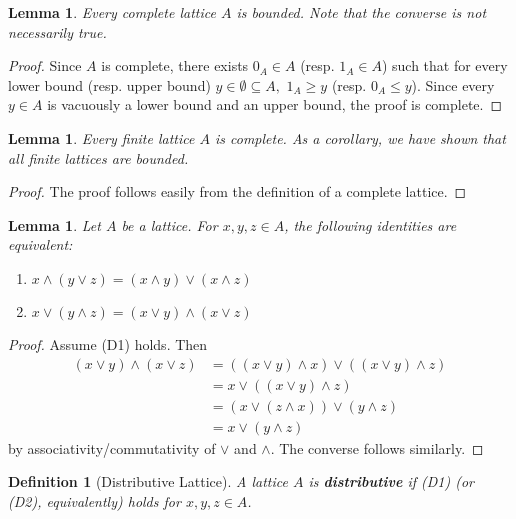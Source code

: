 \documentclass{article}
\newtheorem{lemma}[proposition]{Lemma}
\newtheorem{definition}[proposition]{Definition}
\numberwithin{equation}{section}
\newcommand{\meet}{\wedge}
\newcommand{\join}{\vee}
\begin{document}
\begin{lemma}
Every complete lattice $A$ is bounded. Note that the converse is not necessarily true.
\end{lemma}

\begin{proof}
Since $A$ is complete, there exists $0_A \in A$ (resp. $1_A \in A$) such that for every lower bound (resp. upper bound) $y \in \emptyset \subseteq A,$ $1_A \geq y$ (resp. $0_A \leq y$). Since every $y \in A$ is vacuously a lower bound and an upper bound, the proof is complete.
\end{proof}

\begin{lemma}
Every finite lattice $A$ is complete. As a corollary, we have shown that all finite lattices are bounded.
\end{lemma}

\begin{proof}
The proof follows easily from the definition of a complete lattice. 
\end{proof}

\begin{lemma}
Let $A$ be a lattice. For $x, y, z \in A$, the following identities are equivalent: 
\begin{enumerate}
    \item[D1.]{$x \meet (y \join z) = (x \meet y) \join (x \meet z)$}
    \item[D2.]{$x \join (y \meet z) = (x \join y) \meet (x \join z)$}
\end{enumerate}
\end{lemma}

\begin{proof}
Assume (D1) holds. Then 
\begin{align*}
(x \join y) \meet (x \join z) &= ((x \join y) \meet x) \join ((x \join y) \meet z) 
                           \\ &= x \join ((x \join y) \meet z)
                           \\ &= (x \join (z \meet x)) \join (y \meet z)
                           \\ &= x \join (y \meet z)
\end{align*}
by associativity/commutativity of $\join$ and $\meet$. The converse follows similarly.
\end{proof}

\begin{definition}[Distributive Lattice]
A lattice $A$ is \textbf{distributive} if (D1) (or (D2), equivalently) holds for $x, y, z \in A$.
\end{definition}
\end{document}
